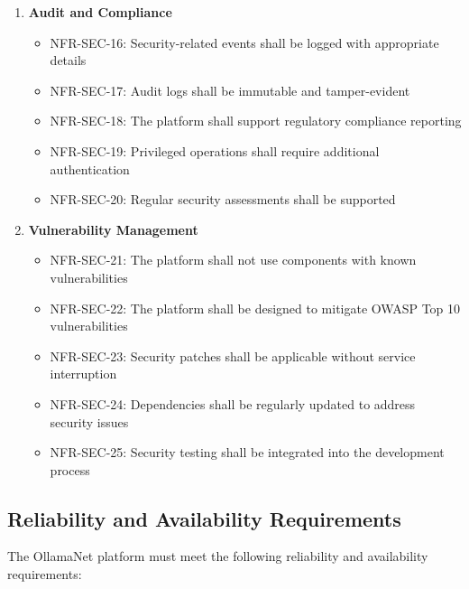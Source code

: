 \begin{enumerate}
   \item \textbf{Audit and Compliance}
   \begin{itemize}
      \item NFR-SEC-16: Security-related events shall be logged with appropriate details
      \item NFR-SEC-17: Audit logs shall be immutable and tamper-evident
      \item NFR-SEC-18: The platform shall support regulatory compliance reporting
      \item NFR-SEC-19: Privileged operations shall require additional authentication
      \item NFR-SEC-20: Regular security assessments shall be supported
   \end{itemize}

   \item \textbf{Vulnerability Management}
   \begin{itemize}
      \item NFR-SEC-21: The platform shall not use components with known vulnerabilities
      \item NFR-SEC-22: The platform shall be designed to mitigate OWASP Top 10 vulnerabilities
      \item NFR-SEC-23: Security patches shall be applicable without service interruption
      \item NFR-SEC-24: Dependencies shall be regularly updated to address security issues
      \item NFR-SEC-25: Security testing shall be integrated into the development process
   \end{itemize}
\end{enumerate}

\subsection{Reliability and Availability Requirements}

The OllamaNet platform must meet the following reliability and availability requirements:

